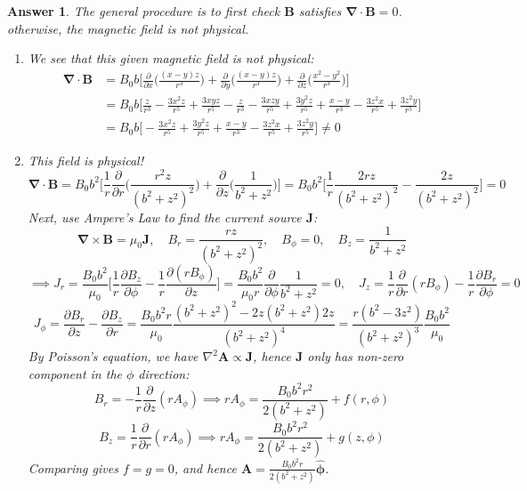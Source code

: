 \documentclass[a4paper]{article}
\newtheorem{ans}{Answer}
\theoremstyle{new}
\begin{document}
\begin{ans}
The general procedure is to first check $\mathbf{B}$ satisfies $\boldsymbol{\nabla}\cdot\mathbf{B}=0$. otherwise, the magnetic field is not physical.
\begin{enumerate}[label=(\alph*)]
\item We see that this given magnetic field is not physical: 
\begin{align}
    \boldsymbol{\nabla}\cdot\mathbf{B}&=B_0b\bigg[\frac{\partial}{\partial x}\bigg(\frac{(x-y)z}{r^3}\bigg)+\frac{\partial}{\partial y}\bigg(\frac{(x-y)z}{r^3}\bigg)+\frac{\partial}{\partial z}\bigg(\frac{x^2-y^2}{r^3}\bigg)\bigg]\nonumber\\
    &=B_0b\bigg[\frac{z}{r^3}-\frac{3x^2z}{r^5}+\frac{3xyz}{r^5}-\frac{z}{r^3}-\frac{3xzy}{r^5}+\frac{3y^2z}{r^5}+\frac{x-y}{r^3}-\frac{3z^2x}{r^5}+\frac{3z^2y}{r^5}\bigg]\nonumber\\
    &=B_0b\bigg[-\frac{3x^2z}{r^5}+\frac{3y^2z}{r^5}+\frac{x-y}{r^3}-\frac{3z^2x}{r^5}+\frac{3z^2y}{r^5}\bigg]\neq 0\nonumber
\end{align}
\item This field is physical!
$$\boldsymbol{\nabla}\cdot\mathbf{B}=B_0b^2\bigg[\frac{1}{r}\frac{\partial}{\partial r}\bigg(\frac{r^2z}{(b^2+z^2)^2}\bigg)+\frac{\partial}{\partial z}\bigg(\frac{1}{b^2+z^2}\bigg)\bigg]=B_0b^2\bigg[\frac{1}{r}\frac{2rz}{(b^2+z^2)^2}-\frac{2z}{(b^2+z^2)^2}\bigg]=0$$
Next, use Ampere's Law to find the current source $\mathbf{J}$:
$$\boldsymbol{\nabla}\times\mathbf{B}=\mu_0\mathbf{J},\quad B_r=\frac{rz}{(b^2+z^2)^2},\quad B_\phi=0,\quad B_z=\frac{1}{b^2+z^2}$$
$$\implies J_r=\frac{B_0b^2}{\mu_0}\bigg[\frac{1}{r}\frac{\partial B_z}{\partial\phi}-\frac{1}{r}\frac{\partial(rB_\phi)}{\partial z}\bigg]=\frac{B_0b^2}{\mu_0r}\frac{\partial}{\partial\phi}\frac{1}{b^2+z^2}=0,\quad J_z=\frac{1}{r}\frac{\partial}{\partial r}(rB_\phi)-\frac{1}{r}\frac{\partial B_r}{\partial\phi}=0$$
$$J_\phi=\frac{\partial B_r}{\partial z}-\frac{\partial B_z}{\partial r}=\frac{B_0b^2r}{\mu_0}\frac{(b^2+z^2)^2-2z(b^2+z^2)2z}{(b^2+z^2)^4}=\frac{r(b^2-3z^2)}{(b^2+z^2)^3}\frac{B_0b^2}{\mu_0}$$
By Poisson's equation, we have $\nabla^2\mathbf{A}\propto\mathbf{J}$, hence $\mathbf{J}$ only has non-zero component in the $\phi$ direction:
$$B_r=-\frac{1}{r}\frac{\partial}{\partial z}(rA_\phi)\implies rA_\phi=\frac{B_0b^2r^2}{2(b^2+z^2)}+f(r,\phi)$$
$$B_z=\frac{1}{r}\frac{\partial}{\partial r}(rA_\phi)\implies rA_\phi=\frac{B_0b^2r^2}{2(b^2+z^2)}+g(z,\phi)$$
Comparing gives $f=g=0$, and hence $\mathbf{A}=\frac{B_0b^2r}{2(b^2+z^2)}\boldsymbol{\hat{\phi}}$.
\end{enumerate}
\end{ans}
\end{document}
